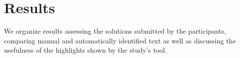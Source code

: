 
\section{Results}
\label{cp6:results}

We organize results assessing the solutions submitted by the participants, 
comparing manual and automatically identified text as well as discussing the usefulness of the highlights shown 
by the study's tool.




